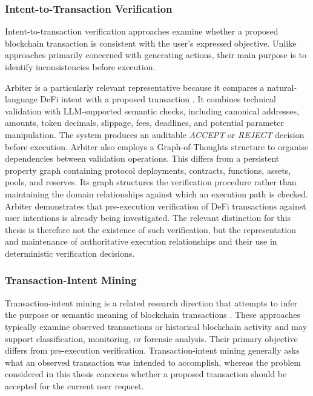 \subsubsection{Intent-to-Transaction Verification}

Intent-to-transaction verification approaches examine whether
a proposed blockchain transaction is consistent with the
user's expressed objective. Unlike approaches primarily
concerned with generating actions, their main purpose is
to identify inconsistencies before execution.

Arbiter is a particularly relevant representative because
it compares a natural-language DeFi intent with a proposed
transaction \cite{TODO_Arbiter2026}. It combines technical
validation with LLM-supported semantic checks, including
canonical addresses, amounts, token decimals, slippage,
fees, deadlines, and potential parameter manipulation.
The system produces an auditable \textit{ACCEPT} or
\textit{REJECT} decision before execution. Arbiter also employs a Graph-of-Thoughts structure to
organise dependencies between validation operations.
This differs from a persistent property graph containing
protocol deployments, contracts, functions, assets,
pools, and reserves. Its graph structures the verification
procedure rather than maintaining the domain relationships
against which an execution path is checked. Arbiter demonstrates that pre-execution verification of
DeFi transactions against user intentions is already
being investigated. The relevant distinction for this
thesis is therefore not the existence of such verification,
but the representation and maintenance of authoritative
execution relationships and their use in deterministic
verification decisions.

\subsubsection{Transaction-Intent Mining}

Transaction-intent mining is a related research direction
that attempts to infer the purpose or semantic meaning
of blockchain transactions
\cite{TODO_TransactionIntentMining}. These approaches
typically examine observed transactions or historical
blockchain activity and may support classification,
monitoring, or forensic analysis. Their primary objective differs from pre-execution
verification. Transaction-intent mining generally asks
what an observed transaction was intended to accomplish,
whereas the problem considered in this thesis concerns
whether a proposed transaction should be accepted for
the current user request.

